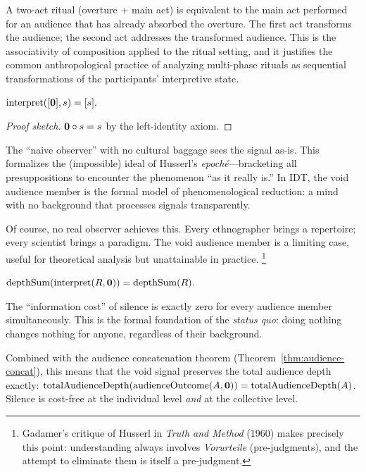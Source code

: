 A two-act ritual (overture + main act) is equivalent to the main act
performed for an audience that has already absorbed the overture.  The first
act transforms the audience; the second act addresses the transformed
audience.  This is the associativity of composition applied to the ritual
setting, and it justifies the common anthropological practice of analyzing
multi-phase rituals as sequential transformations of the participants'
interpretive state.

\begin{theorem}
\label{thm:void-audience-member}
$\mathrm{interpret}([\mathbf{0}], s) = [s].$
\end{theorem}

\begin{proof}[Proof sketch]
$\mathbf{0}\circ s = s$ by the left-identity axiom.
\end{proof}

The ``naive observer'' with no cultural baggage sees the signal as-is.  This
formalizes the (impossible) ideal of Husserl's \emph{epoch\'e}---bracketing
all presuppositions to encounter the phenomenon ``as it really is.''  In
IDT, the void audience member is the formal model of phenomenological
reduction: a mind with no background that processes signals transparently.

Of course, no real observer achieves this.  Every ethnographer brings a
repertoire; every scientist brings a paradigm.  The void audience member is
a limiting case, useful for theoretical analysis but unattainable in
practice.%
\footnote{Gadamer's critique of Husserl in \textit{Truth and Method} (1960)
makes precisely this point: understanding always involves
\emph{Vorurteile} (pre-judgments), and the attempt to eliminate them is
itself a pre-judgment.}

\begin{theorem}
\label{thm:void-outcome-preserved}
$\mathrm{depthSum}(\mathrm{interpret}(R, \mathbf{0})) = \mathrm{depthSum}(R).$
\end{theorem}

The ``information cost'' of silence is exactly zero for every audience member
simultaneously.  This is the formal foundation of the \emph{status quo}:
doing nothing changes nothing for anyone, regardless of their background.

Combined with the audience concatenation theorem
(Theorem~\ref{thm:audience-concat}), this means that the void signal
preserves the total audience depth exactly:
$\mathrm{totalAudienceDepth}(\mathrm{audienceOutcome}(A,\mathbf{0}))
= \mathrm{totalAudienceDepth}(A)$.
Silence is cost-free at the individual level \emph{and} at the collective
level.

